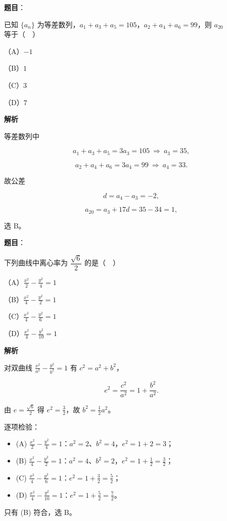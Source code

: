 \begin{answer}

\textbf{题目}：

已知 $\{a_n\}$ 为等差数列，$a_1+a_3+a_5=105$，$a_2+a_4+a_6=99$，则 $a_{20}$ 等于（　）

（A）$-1$

（B）$1$

（C）$3$

（D）$7$

\textbf{解析}

等差数列中

\nopagebreak[4]
\[a_1+a_3+a_5=3a_3=105\ \Longrightarrow\ a_3=35,\]

\nopagebreak[4]
\[a_2+a_4+a_6=3a_4=99\ \Longrightarrow\ a_4=33 .\]

故公差

\nopagebreak[4]
\[d=a_4-a_3=-2,\]

\nopagebreak[4]
\[a_{20}=a_3+17d=35-34=1,\]

选 B。


\end{answer}
\begin{answer}

\textbf{题目}：

下列曲线中离心率为 $\dfrac{\sqrt6}{2}$ 的是（　）

（A）$\frac{x^2}{2}-\frac{y^2}{4}=1$

（B）$\frac{x^2}{4}-\frac{y^2}{2}=1$

（C）$\frac{x^2}{4}-\frac{y^2}{6}=1$

（D）$\frac{x^2}{4}-\frac{y^2}{10}=1$

\textbf{解析}

对双曲线 $\frac{x^2}{a^2}-\frac{y^2}{b^2}=1$ 有 $c^2=a^2+b^2$，

\nopagebreak[4]
\[e^2=\frac{c^2}{a^2}=1+\frac{b^2}{a^2}.\]

由 $e=\frac{\sqrt6}{2}$ 得 $e^2=\frac32$，故 $b^2=\frac12a^2$。

逐项检验：

\begin{itemize}
\item (A) $\frac{x^2}{2}-\frac{y^2}{4}=1$：$a^2=2$、$b^2=4$，$e^2=1+2=3$；
\item (B) $\frac{x^2}{4}-\frac{y^2}{2}=1$：$a^2=4$、$b^2=2$，$e^2=1+\frac12=\frac32$；
\item (C) $\frac{x^2}{4}-\frac{y^2}{6}=1$：$e^2=1+\frac32=\frac52$；
\item (D) $\frac{x^2}{4}-\frac{y^2}{10}=1$：$e^2=1+\frac52=\frac72$。
\end{itemize}

只有 (B) 符合，选 B。


\end{answer}
